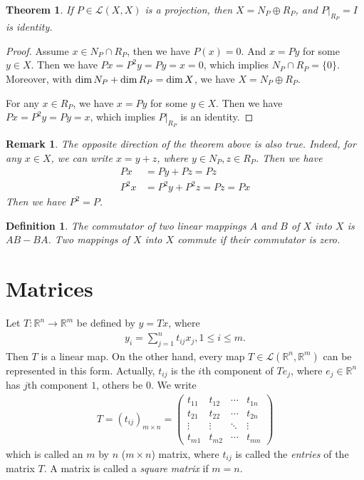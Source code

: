 \documentclass[11pt]{book}
\newtheorem{definition}{Definition}[section]
\newtheorem{theorem}{Theorem}[section]
\newtheorem{remark}{Remark}[section]
\theoremstyle{definition}
\numberwithin{equation}{subsection}
\begin{document}
\begin{theorem}
If $P\in\mathscr{L}(X,X)$ is a projection, then $X = N_P\oplus R_P$, and $P|_{R_P} = I$ is identity.
\end{theorem}
\begin{proof}
Assume $x\in N_P\cap R_P$, then we have $P(x) = 0$. And $x = P y$ for some $y\in X$. Then we have $Px = P^2 y = P y = x = 0$, which implies $N_P\cap R_P = \{0\}$. Moreover, with ${\rm dim}\, N_P + {\rm dim}\, R_P = {\rm dim}\, X$, we have $X = N_P\oplus R_P$.

For any $x\in R_P$, we have $x = P y$ for some $y\in X$. Then we have $Px = P^2 y = Py = x$, which implies $P|_{R_P}$ is an identity.
\end{proof}
\begin{remark}
The opposite direction of the theorem above is also true. Indeed, for any $x\in X$, we can write $x = y+z$, where $y\in N_P, z\in R_P$. Then we have
\begin{align*}
    Px & = Py + Pz = Pz\\
    P^2 x & = P^2 y + P^2 z = Pz = Px
\end{align*}
Then we have $P^2=P$.
\end{remark}

\medskip

\begin{definition}
The commutator of two linear mappings $A$ and $B$ of $X$ into $X$ is $AB - BA$. Two mappings of $X$ into $X$ commute if their commutator is zero.
\end{definition}


\medskip

\chapter{Matrices}
Let $T:\mathbb{R}^n\to\mathbb{R}^m$ be defined by $y = T x$, where
\begin{align*}
    y_i = \sum^n_{j=1} t_{ij}x_j, 1\leq i\leq m.
\end{align*}
Then $T$ is a linear map. On the other hand, every map $T\in \mathscr{L}(\mathbb{R}^n,\mathbb{R}^m)$ can be represented in this form. Actually, $t_{ij}$ is the $i$th component of $Te_j$, where $e_j\in \mathbb{R}^n$ has $j$th component $1$, others be $0$. We write
\begin{align*}
    T = (t_{ij})_{m\times n} = \left(
        \begin{matrix}
        t_{11} & t_{12} & \cdots & t_{1n}\\
        t_{21} & t_{22} & \cdots & t_{2n}\\
        \vdots & \vdots & \ddots & \vdots\\
        t_{m1} & t_{m2} & \cdots & t_{mn}
        \end{matrix}
    \right)
\end{align*}
which is called an $m$ by $n$ ($m\times n$) matrix, where $t_{ij}$ is called the \emph{entries} of the matrix $T$. A matrix is called a \emph{square matrix} if $m=n$. 
\end{document}
